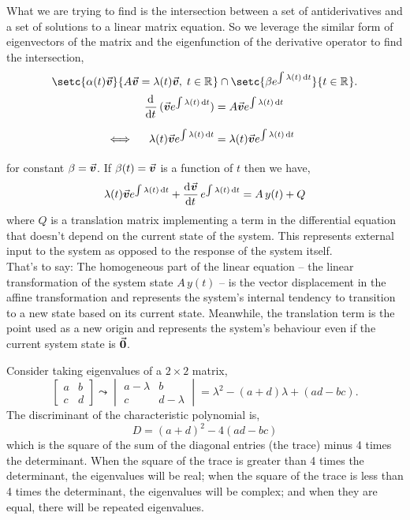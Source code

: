 \documentclass[../MathsNotesBase.tex]{subfiles}
\begin{document}
{		\bigskip
		What we are trying to find is the intersection between a set of antiderivatives and a set of solutions to a linear matrix equation. So we leverage the similar form of eigenvectors of the matrix and the eigenfunction of the derivative operator to find the intersection,
		\[ \setc{\alpha(t)\v}{A\v = \lambda(t) \v,\; t \in \R{}} \cap \setc{\beta e^{\int \lambda(t) \dif t}}{t \in \R{}}. \]
		\[\begin{aligned}
			&& \dod{}{t}(\v e^{\int \lambda(t) \dif t}) &= A\v e^{\int \lambda(t) \dif t} \nn
			&\iff & \lambda(t) \v e^{\int \lambda(t) \dif t} &= \lambda(t) \v e^{\int \lambda(t) \dif t} &\sidecomment{} \nn
		\end{aligned}\]
		for constant ${ \beta = \vec{\bm{v}} }$. If ${ \beta(t) = \vec{\bm{v}} }$ is a function of $t$ then we have,
		\[  \lambda(t) \v e^{\int \lambda(t) \dif t} + \dod{\v}{t} e^{\int \lambda(t) \dif t} = A\, y(t) + Q \]
		where $Q$ is a translation matrix implementing a term in the differential equation that doesn't depend on the current state of the system. This represents external input to the system as opposed to the response of the system itself.\\
		That's to say: The homogeneous part of the linear equation -- the linear transformation of the system state ${ A\, y(t) }$ -- is the vector displacement in the affine transformation and represents the system's internal tendency to transition to a new state based on its current state. Meanwhile, the translation term is the point used as a new origin and represents the system's behaviour even if the current system state is ${ \vec{\bm{0}} }$.\\
		
		\bigskip
		
		\biggerskip
		
		Consider taking eigenvalues of a ${ 2 \times 2 }$ matrix,
		\[ 	\begin{bmatrix}
				a & b\\
				c & d
			\end{bmatrix} \leadsto
			\begin{vmatrix}
				a-\lambda & b\\
				c & d-\lambda
			\end{vmatrix} = \lambda^2 - (a+d)\lambda + (ad - bc).
		\]
		The discriminant of the characteristic polynomial is,
		\[ D = (a+d)^2 - 4(ad - bc) \]
		which is the square of the sum of the diagonal entries (the trace) minus 4 times the determinant. When the square of the trace is greater than 4 times the determinant, the eigenvalues will be real; when the square of the trace is less than 4 times the determinant, the eigenvalues will be complex; and when they are equal, there will be repeated eigenvalues.\\
		
}
\end{document}
